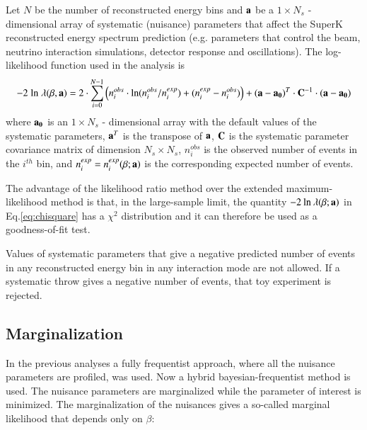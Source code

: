 Let $N$ be the number of reconstructed energy bins and
${\bf a}$ be a $1 \times N_{s}$ - dimensional array of systematic (nuisance) 
parameters that affect the SuperK reconstructed energy spectrum prediction (e.g.
parameters that control the beam, neutrino interaction simulations, 
detector response and oscillations).
The log-likelihood function used in the analysis is
\begin{equation}
\displaystyle
-2 \; \textrm{ln} \; \lambda (\beta,{\bf a}) = 2 \cdot \sum_{i=0}^{N-1} 
   \Big( 
     n^{obs}_{i} \cdot \textrm{ln} (n^{obs}_{i}/n^{exp}_{i}) +
     (n^{exp}_{i}-n^{obs}_{i}) 
   \Big) +
   ({\bf a}-{\bf a_{0}})^{T} \cdot {\bf C}^{-1} \cdot ({\bf a}-{\bf a_{0}})
\label{eq:chisquare}
\end{equation}
where
${\bf a_{0}}$ is an $1 \times N_{s}$ - dimensional array with the default values of 
the systematic parameters, ${\bf a}^{T}$ is the transpose of ${\bf a}$,
${\bf C}$ is the systematic parameter covariance matrix of dimension $N_{s} \times N_{s}$,
$n^{obs}_{i}$ is the observed number of events in the $i^{th}$ bin, and
$n^{exp}_{i} = n^{exp}_{i}(\beta; {\bf a})$ 
is the corresponding expected number of events.

The advantage of the likelihood ratio method over the extended maximum-likelihood method is that,
in the large-sample limit, the quantity 
$-2 \: \textrm{ln} \: \lambda (\beta; {\bf a})$
in Eq.\ref{eq:chisquare} has a $\chi^{2}$ distribution and it can therefore be used as a goodness-of-fit test.

Values of systematic parameters that give a negative predicted number of events in any reconstructed energy bin in any interaction 
mode are not allowed. If a systematic throw gives a negative number of events, that toy experiment is rejected.


\subsection {Marginalization}
\label{sec:marginalization}

In the previous analyses a fully frequentist approach, where all the nuisance parameters are profiled, was used.
Now a hybrid bayesian-frequentist method is used. The nuisance parameters are marginalized while the parameter of interest is minimized.
The marginalization of the nuisances gives a so-called marginal likelihood that depends only on $\beta$:

